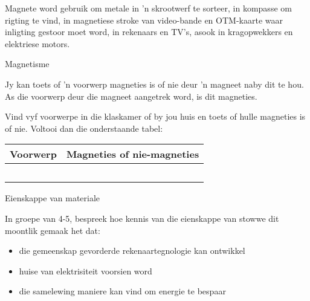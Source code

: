       \label{m38706*id67200}Magnete word gebruik om metale in 'n skrootwerf te sorteer, in kompasse om rigting te vind, in magnetiese stroke van video-bande en OTM-kaarte waar inligting gestoor moet word, in rekenaars en TV's, asook in kragopwekkers en elektriese motors.
\par 
\label{m38706*secfhsst!!!underscore!!!id575}
            \begin{Investigation}{Magnetisme}{
            \nopagebreak
      \label{m38706*id67220}      Jy kan toets of 'n voorwerp magneties is of nie deur 'n magneet naby dit te hou. As die voorwerp deur die magneet aangetrek word, is dit magneties.\par 
      \label{m38706*id67227}Vind vyf voorwerpe in die klaskamer of by jou huis en toets of hulle magneties is of nie. Voltooi dan die onderstaande tabel:\par 
          \begin{table}[H]
        \begin{center}
      \label{m38706*id67234}
    \noindent
      \begin{tabular}{|p{3cm}|p{1.5cm}|}\hline
                \textbf{Voorwerp}
               &
                \textbf{Magneties of nie-magneties} \\ \hline
         & \\ \hline
         & \\ \hline
         & \\ \hline
         & \\ \hline
         & \\ \hline
    \end{tabular}
      \end{center}
\end{table}}

\end{Investigation}
    \par
\label{m38706*secfhsst!!!underscore!!!id616}
            \begin{groupdiscussion}{Eienskappe van materiale}{
            \nopagebreak
      \label{m38706*id67392} In groepe van 4-5, bespreek hoe kennis van die eienskappe van stowwe dit moontlik gemaak het dat:\par 
\begin{itemize}[noitemsep]
    \item die gemeenskap gevorderde rekenaartegnologie kan ontwikkel
    \item huise van elektrisiteit voorsien word
    \item die samelewing maniere kan vind om energie te bespaar
\end{itemize}
}\end{groupdiscussion}
